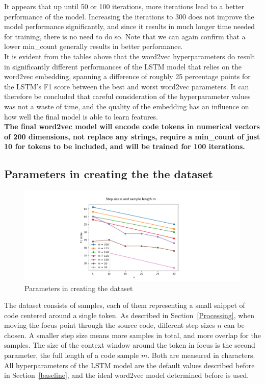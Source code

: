 \documentclass[
a4paper,
pagesize,
pdftex,
12pt,
twoside, %
BCOR=5mm, %
ngerman,
fleqn,
final,
]{scrartcl}
\begin{document}
	It appears that up until 50 or 100 iterations, more iterations lead to a better performance of the model. Increasing the iterations to 300 does not improve the model performance significantly, and since it results in much longer time needed for training, there is no need to do so. Note that we can again confirm that a lower min\_count generally results in better performance.\\
	It is evident from the tables above that the word2vec hyperparameters do result in significantly different performances of the LSTM model that relies on the word2vec embedding, spanning a difference of roughly 25 percentage points for the LSTM's F1 score between the best and worst word2vec parameters. It can therefore be concluded that careful consideration of the hyperparameter values was not a waste of time, and the quality of the embedding has an influence on how well the final model is able to learn features.\\
	
	\textbf{The final word2vec model will encode code tokens in numerical vectors of 200 dimensions, not replace any strings, require a min\_count of just 10 for tokens to be included, and will be trained for 100 iterations.}\\
	
	
	\subsection{Parameters in creating the the dataset}
	
	\begin{figure}[H]
		\centering
		\includegraphics[width=1\textwidth]{img/parametersmn}
		\caption{Parameters in creating the dataset}
		\label{fig:mn}
	\end{figure}
	The dataset consists of samples, each of them representing a small snippet of code centered around a single token. As described in Section~\ref{Processing}, when moving the focus point through the source code, different step sizes $n$ can be chosen. A smaller step size means more samples in total, and more overlap for the samples. The size of the context window around the token in focus is the second parameter, the full length of a code sample $m$. Both are measured in characters. All  hyperparameters of the LSTM model are the default values described before in Section~\ref{baseline}, and the ideal word2vec model determined before is used.
	
\end{document}
